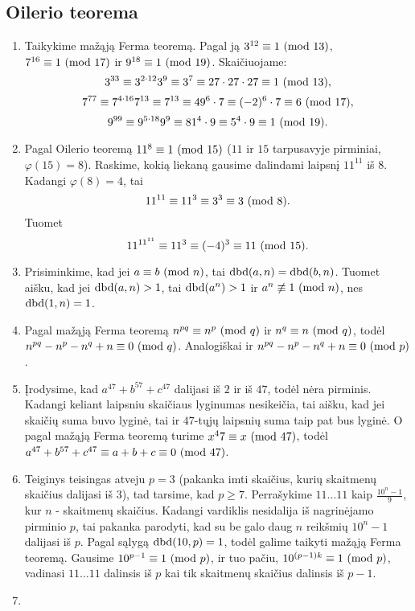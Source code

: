 \subsection*{Oilerio teorema}
\begin{enumerate} 
\item 
Taikykime mažąją Ferma teoremą. Pagal ją $3^{12}\equiv 1 \ (\text{mod } 13)$,
$7^{16} \equiv 1\ (\text{mod } 17)$ ir $9^{18} \equiv 1 \ (\text{mod } 19)$. Skaičiuojame:
$$3^{33} \equiv 3^{2\cdot 12}3^{9} \equiv 3^7 \equiv 27\cdot 27\cdot
27	 \equiv 1 \ (\text{mod } 13),$$
$$7^{77} \equiv 7^{4\cdot 16}7^{13} \equiv 7^{13} \equiv 49^6\cdot 7
\equiv (-2)^6 \cdot 7\equiv 6 \ (\text{mod } 17),$$
$$9^{99} \equiv 9^{5 \cdot 18}9^9 \equiv 81^4\cdot 9 \equiv 5^4 \cdot 9
\equiv 1 \ (\text{mod } 19).$$
\item 
Pagal Oilerio teoremą $11^{8} \equiv 1 \ (\text{mod } 15)$ ($11$ ir $15$
tarpusavyje pirminiai, $\varphi(15)=8$). Raskime, kokią liekaną
gausime dalindami laipsnį $11^{11}$ iš $8$. Kadangi $\varphi(8) = 4$,
tai $$11^{11} \equiv 11^{3} \equiv 3^3 \equiv 3 \ (\text{mod } 8).$$ Tuomet
$$11^{11^{11}} \equiv 11^3 \equiv (-4)^3 \equiv 11 \ (\text{mod } 15).$$
\item 
Prisiminkime, kad jei $a \equiv b \ (\text{mod } n)$, tai $\operatorname{dbd}(a,n) =
\operatorname{dbd}(b,n)$. Tuomet aišku, kad jei $\operatorname{dbd}(a,n) > 1$, tai $\operatorname{dbd}(a^n) >1$
ir $a^n \not \equiv 1\ (\text{mod } n)$, nes $\operatorname{dbd}(1,n)=1$.
\item 
Pagal mažąją Ferma teoremą $n^{pq} \equiv n^p \ (\text{mod } q)$ ir $n^q \equiv
n \ (\text{mod } q)$, todėl $n^{pq} - n^p - n^q + n \equiv 0 \ (\text{mod } q)$. Analogiškai
ir $n^{pq} - n^p - n^q +n \equiv 0 \ (\text{mod } p)$.
\item 
Įrodysime, kad $a^{47}+b^{57}+c^{47}$ dalijasi iš $2$ ir iš $47$,
todėl nėra pirminis. Kadangi keliant laipsniu skaičiaus lyginumas
nesikeičia, tai aišku, kad jei skaičių suma buvo lyginė, tai ir
$47$-tųjų laipsnių suma taip pat bus lyginė. O pagal mažąją Ferma
teoremą turime $x^47 \equiv x \ (\text{mod } 47)$, todėl $a^{47} + b^{57} +
c^{47}\equiv a+b+c \equiv 0 \ (\text{mod } 47)$.
\item 
Teiginys teisingas atveju $p=3$ (pakanka imti skaičius, kurių
skaitmenų skaičius dalijasi iš $3$), tad tarsime, kad $p\geq 7$.
Perrašykime $11\dots11$ kaip $\frac{10^n-1}{9}$, kur $n$ - skaitmenų
skaičius. Kadangi vardiklis nesidalija iš nagrinėjamo pirminio
$p$, tai pakanka parodyti, kad su be galo daug $n$ reikšmių $10^n - 1$
dalijasi iš $p$. Pagal sąlygą $\operatorname{dbd}(10,p)=1$, todėl galime taikyti
mažąją Ferma teoremą. Gausime $10^{p-1} \equiv 1 \ (\text{mod } p)$, ir tuo pačiu,
$10^{(p-1)k}\equiv 1\ (\text{mod } p)$, vadinasi $11\dots11$ dalinsis iš
$p$ kai tik skaitmenų skaičius dalinsis iš $p-1$.
\item 

\end{enumerate}
